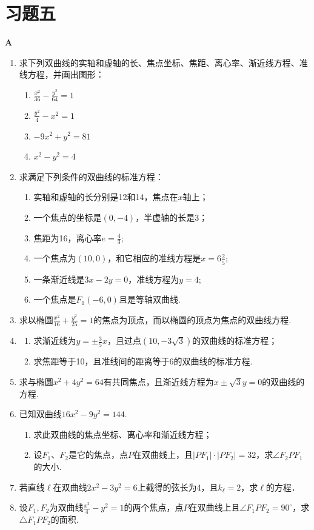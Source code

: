\section*{习题五}
\begin{center}
    \bfseries A
\end{center}

\begin{enumerate}
    \item  求下列双曲线的实轴和虚轴的长、焦点坐标、焦距、离心率、渐近线方程、准线方程，并画出图形：
\begin{enumerate}[(1)]
    \item $\frac{x^2}{36}-\frac{y^2}{64}=1$
    \item $\frac{y^2}{4}-x^2=1$
    \item $-9{x^2}+{y^2}=81$
    \item $x^2-y^2=4$
\end{enumerate}
    \item  求满足下列条件的双曲线的标准方程：
\begin{enumerate}[(1)]
\item 实轴和虚轴的长分别是12和14，焦点在$x$轴上；
\item 一个焦点的坐标是$(0,-4)$，半虚轴的长是3；
\item 焦距为16，离心率$e=\frac{4}{3}$;
\item 一个焦点为$(10,0)$，和它相应的准线方程是$x=6\frac{2}{5}$;
\item 一条渐近线是$3x-2y=0$，准线方程为$y=4$;
\item 一个焦点是$F_1(-6,0)$且是等轴双曲线.
\end{enumerate}

    \item  求以椭圆$\frac{x^2}{16}+\frac{y^2}{25}=1$的焦点为顶点，而以椭圆的顶点为焦点的双曲线方程.
    \item \begin{enumerate}[(1)]
        \item 求渐近线为$y=\pm\frac{3}{5}x$，且过点$(10,-3\sqrt{3})$的双曲线的标准方程；
        \item 求焦距等于10，且准线间的距离等于6的双曲线的标准方程.
    \end{enumerate}

\item  求与椭圆$x^2+4y^2=64$有共同焦点，且渐近线方程为$x\pm\sqrt{3}y=0$的双曲线的方程.
\item  已知双曲线$16x^2-9y^2=144$.
\begin{enumerate}[(1)]
\item 求此双曲线的焦点坐标、离心率和渐近线方程；
\item 设$F_1$、$F_2$是它的焦点，点$P$在双曲线上，且$|PF_1|\cdot |PF_2|=32$，求$\angle F_2PF_1$的大小.
\end{enumerate}

\item  若直线$\ell$在双曲线$2x^2-3y^2=6$上截得的弦长为4，且$k_{\ell}=2$，求$\ell$的方程．
\item  设$F_1,F_2$为双曲线$\frac{x^2}{4}-y^2=1$的两个焦点，点$P$在双曲线上且$\angle F_1PF_2=90^{\circ}$，求$\triangle F_1PF_2$的面积.
\end{enumerate}


